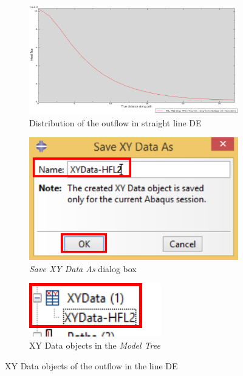 \begin{itemize}
  \begin{figure}[!h]
    \centering
    \begin{subfigure}[!h]{0.80\textwidth}
      \includegraphics[width=\textwidth]{./body/images/post16}
      \caption{Distribution of the outflow in straight line DE}
      \label{post16}
    \end{subfigure}%
    
    \begin{subfigure}[!h]{0.30\textwidth}
      \includegraphics[width=\textwidth]{./body/images/post17.pdf}
      \caption{\textit{Save XY Data As} dialog box}
      \label{post17}
    \end{subfigure}\quad
    \begin{subfigure}[!h]{0.30\textwidth}
      \includegraphics[width=\textwidth]{./body/images/post18.pdf}
      \caption{XY Data objects in the \textit{Model Tree}}
      \label{post18}
    \end{subfigure}%
    \caption{ XY Data objects of the outflow in the line DE}
  \end{figure}


\end{itemize}
